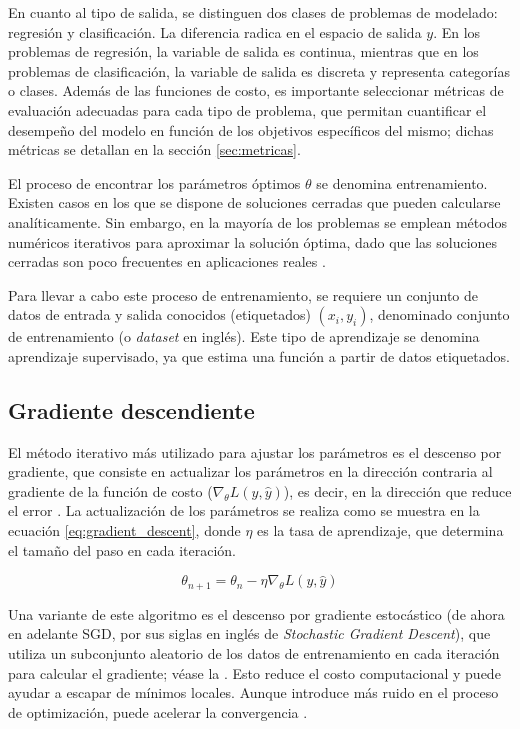 En cuanto al tipo de salida, se distinguen dos clases de problemas de modelado: regresión y clasificación. La diferencia radica en el espacio de salida $y$. En los problemas de regresión, la variable de salida es continua, mientras que en los problemas de clasificación, la variable de salida es discreta y representa categorías o clases. Además de las funciones de costo, es importante seleccionar métricas de evaluación adecuadas para cada tipo de problema, que permitan cuantificar el desempeño del modelo en función de los objetivos específicos del mismo; dichas métricas se detallan en la sección \ref{sec:metricas}.

El proceso de encontrar los parámetros óptimos $\theta$ se denomina entrenamiento. Existen casos en los que se dispone de soluciones cerradas que pueden calcularse analíticamente. Sin embargo, en la mayoría de los problemas se emplean métodos numéricos iterativos para aproximar la solución óptima, dado que las soluciones cerradas son poco frecuentes en aplicaciones reales \cite{e23081012}.

Para llevar a cabo este proceso de entrenamiento, se requiere un conjunto de datos de entrada y salida conocidos (etiquetados) $\left(x_i, y_i\right)$, denominado conjunto de entrenamiento (o \textit{dataset} en inglés). Este tipo de aprendizaje se denomina aprendizaje supervisado, ya que estima una función a partir de datos etiquetados.

\subsection{Gradiente descendiente}
\label{sec:gradiente_descendiente}

El método iterativo más utilizado para ajustar los parámetros es el descenso por gradiente, que consiste en actualizar los parámetros en la dirección contraria al gradiente de la función de costo ($\nabla_{\theta} L(y, \hat{y})$), es decir, en la dirección que reduce el error \cite{9603742}. La actualización de los parámetros se realiza como se muestra en la ecuación \ref{eq:gradient_descent}, donde $\eta$ es la tasa de aprendizaje, que determina el tamaño del paso en cada iteración.

\begin{equation}
    \label{eq:gradient_descent}
    \theta_{n+1} = \theta_n - \eta \nabla_{\theta} L(y, \hat{y})
\end{equation}

Una variante de este algoritmo es el descenso por gradiente estocástico (de ahora en adelante SGD, por sus siglas en inglés de \textit{Stochastic Gradient Descent}), que utiliza un subconjunto aleatorio de los datos de entrenamiento en cada iteración para calcular el gradiente; véase la . Esto reduce el costo computacional y puede ayudar a escapar de mínimos locales. Aunque introduce más ruido en el proceso de optimización, puede acelerar la convergencia \cite{robbins1951stochastic}.

